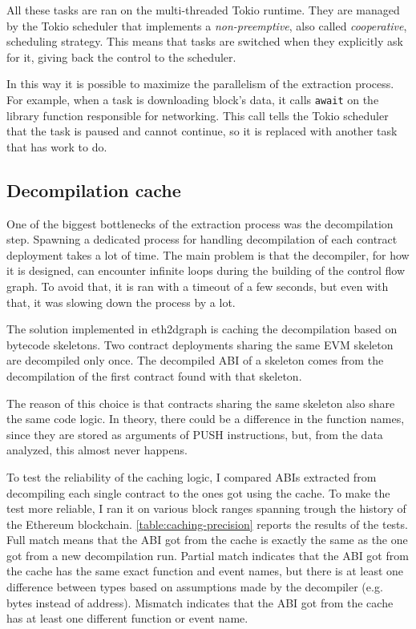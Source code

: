 All these tasks are ran on the multi-threaded Tokio runtime. They are managed by the Tokio scheduler that implements a \textit{non-preemptive}, also called \textit{cooperative}, scheduling strategy. This means that tasks are switched when they explicitly ask for it, giving back the control to the scheduler. 

In this way it is possible to maximize the parallelism of the extraction process. For example, when a task is downloading block's data, it calls \texttt{await} on the library function responsible for networking. This call tells the Tokio scheduler that the task is paused and cannot continue, so it is replaced with another task that has work to do.

\subsection{Decompilation cache}

One of the biggest bottlenecks of the extraction process was the decompilation step. Spawning a dedicated process for handling decompilation of each contract deployment takes a lot of time. The main problem is that the decompiler, for how it is designed, can encounter infinite loops during the building of the control flow graph. To avoid that, it is ran with a timeout of a few seconds, but even with that, it was slowing down the process by a lot.

The solution implemented in eth2dgraph is caching the decompilation based on bytecode skeletons. Two contract deployments sharing the same EVM skeleton are decompiled only once. The decompiled ABI of a skeleton comes from the decompilation of the first contract found with that skeleton.

The reason of this choice is that contracts sharing the same skeleton also share the same code logic. In theory, there could be a difference in the function names, since they are stored as arguments of PUSH instructions, but, from the data analyzed, this almost never happens.

To test the reliability of the caching logic, I compared ABIs extracted from decompiling each single contract to the ones got using the cache. To make the test more reliable, I ran it on various block ranges spanning trough the history of the Ethereum blockchain. \cref{table:caching-precision} reports the results of the tests. Full match means that the ABI got from the cache is exactly the same as the one got from a new decompilation run. Partial match indicates that the ABI got from the cache has the same exact function and event names, but there is at least one difference between types based on assumptions made by the decompiler (e.g. bytes instead of address). Mismatch indicates that the ABI got from the cache has at least one different function or event name.

